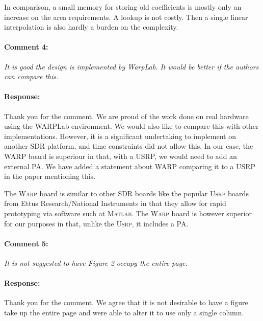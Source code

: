 \documentclass[]{article}
\begin{document}
In comparison, a small memory for storing old coefficients is mostly only an increase on the area requirements. A lookup is not costly. Then a single linear interpolation is also hardly a burden on the complexity.
	
\paragraph{Comment 4:}\textit{It is good the design is implemented by WarpLab. It would be better if the authors can compare this.}
\paragraph{Response:}
Thank you for the comment. We are proud of the work done on real hardware using the WARPLab environment. We would also like to compare this with other implementations. However, it is a significant undertaking to implement on another SDR platform, and time constraints did not allow this. In our case, the WARP board is superiour in that, with a USRP, we would need to add an external PA. We have added a statement about WARP comparing it to a USRP in the paper mentioning this. 

{\color{red} The \textsc{Warp} board is similar to other SDR boards like the popular \textsc{Usrp} boards from Ettus Research/National Instruments in that they allow for rapid prototyping via software such at \textsc{Matlab}. The \textsc{Warp} board is however superior for our purposes in that, unlike the \textsc{Usrp}, it includes a PA.}

\paragraph{Comment 5:}\textit{It is not suggested to have Figure 2 occupy the entire page.}
\paragraph{Response:}
Thank you for the comment. We agree that it is not desirable to have a figure take up the entire page and were able to alter it to use only a single column. 
\end{document}

